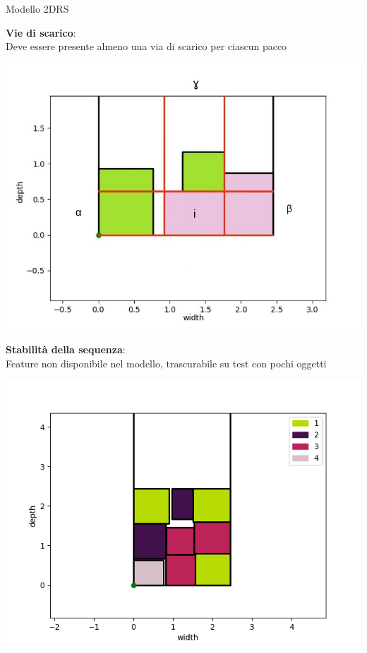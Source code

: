 \documentclass{beamer}
\begin{document}
\begin{frame}{Modello 2DRS}
								
	\begin{minipage}[c]{0.45\textwidth}
		\textbf{Vie di scarico}:\\Deve essere presente almeno una via di scarico per ciascun pacco
	\end{minipage}
	\hfill
	\begin{minipage}[c]{0.45\textwidth}
		\includegraphics[width=1\linewidth]{figures/abg_2drs}
	\end{minipage}
																									
	\begin{minipage}[c]{0.45\textwidth}
		\textbf{Stabilit\`a della sequenza}:\\ Feature non disponibile nel modello, trascurabile su test con pochi oggetti
	\end{minipage}
	\hfill
	\begin{minipage}[c]{0.45\textwidth}
		\includegraphics[width=1\linewidth]{figures/2d3d}
	\end{minipage}
\end{frame}
\end{document}
